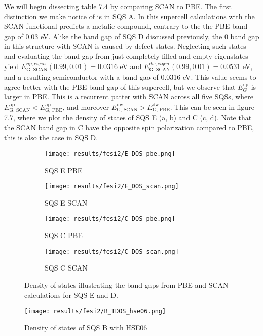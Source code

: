 We will begin dissecting table 7.4 by comparing SCAN to PBE. The first distinction we make notice of is in SQS A. In this supercell calculations with the SCAN functional predicts a metalic compound, contrary to the the PBE band gap of 0.03 eV. Alike the band gap of SQS D discussed previously, the 0 band gap in this structure with SCAN is caused by defect states. Neglecting such states and evaluating the band gap from just completely filled and empty eigenstates yield $E_\text{G, SCAN} ^{up, eigen}(0.99, 0.01) = 0.0316$ eV and $E_\text{G, SCAN} ^{dw, eigen}(0.99, 0.01) = 0.0531$ eV, and a resulting semiconductor with a band gao of 0.0316 eV. This value seems to agree better with the PBE band gap of this supercell, but we observe that $E_G ^\text{up}$ is larger in PBE.  This is a recurrent patter with SCAN across all five SQSs, where $E_\text{G, SCAN} ^\text{up} < E_\text{G, PBE} ^\text{up}$, and moreover $E_\text{G, SCAN} ^\text{dw} > E_\text{G, PBE} ^\text{dw}$. This can be seen in figure 7.7, where we plot the density of states of SQS E (a, b) and C (c, d). Note that the SCAN band gap in C have the opposite spin polarization compared to PBE, this is also the case in SQS D.

\begin{figure}[H]
	\begin{subfigure}{.5\textwidth}
		\texttt{[image: results/fesi2/E\_DOS\_pbe.png]}
		\caption{SQS E PBE}
	\end{subfigure}
	\begin{subfigure}{.5\textwidth}
		\texttt{[image: results/fesi2/E\_DOS\_scan.png]}
		\caption{SQS E SCAN}
	\end{subfigure}
	\begin{subfigure}{.5\textwidth}
		\texttt{[image: results/fesi2/C\_DOS\_pbe.png]}
		\caption{SQS C PBE}
	\end{subfigure}
	\begin{subfigure}{.5\textwidth}
		\texttt{[image: results/fesi2/C\_DOS\_scan.png]}
		\caption{SQS C SCAN}
	\end{subfigure}
	\caption{Density of states illustrating the band gaps from PBE and SCAN calculations for SQS E and D.}
\end{figure}

\begin{figure}[H]
	\centering	
	\texttt{[image: results/fesi2/B\_TDOS\_hse06.png]}
	\caption{Density of states of SQS B with HSE06}
\end{figure}

